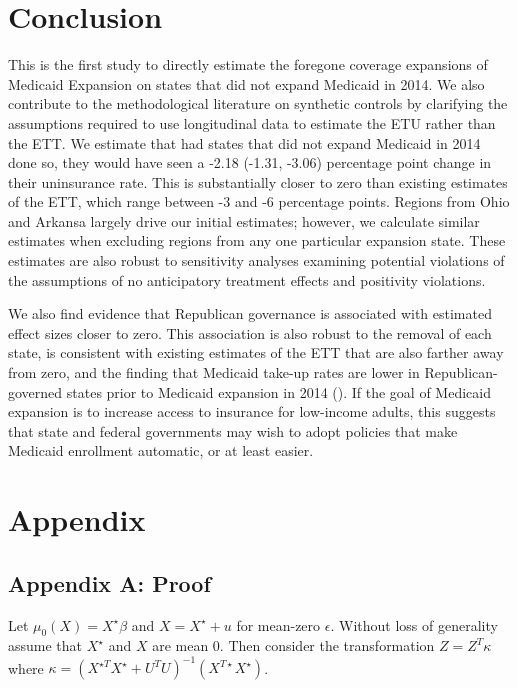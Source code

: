 \documentclass[12pt]{article}
\begin{document}
\section{Conclusion}

This is the first study to directly estimate the foregone coverage expansions of Medicaid Expansion on states that did not expand Medicaid in 2014. We also contribute to the methodological literature on synthetic controls by clarifying the assumptions required to use longitudinal data to estimate the ETU rather than the ETT. We estimate that had states that did not expand Medicaid in 2014 done so, they would have seen a -2.18 (-1.31, -3.06) percentage point change in their uninsurance rate. This is substantially closer to zero than existing estimates of the ETT, which range between -3 and -6 percentage points. Regions from Ohio and Arkansa largely drive our initial estimates; however, we calculate similar estimates when excluding regions from any one particular expansion state. These estimates are also robust to sensitivity analyses examining potential violations of the assumptions of no anticipatory treatment effects and positivity violations. 

We also find evidence that Republican governance is associated with estimated effect sizes closer to zero. This association is also robust to the removal of each state, is consistent with existing estimates of the ETT that are also farther away from zero, and the finding that Medicaid take-up rates are lower in Republican-governed states prior to Medicaid expansion in 2014 (\cite{sommers2012understanding}). If the goal of Medicaid expansion is to increase access to insurance for low-income adults, this suggests that state and federal governments may wish to adopt policies that make Medicaid enrollment automatic, or at least easier.

\cleardoublepage
 

\cleardoublepage

\section{Appendix}

\subsection{Appendix A: Proof}

Let $\mu_0(X) = X^\star\beta$ and $X = X^\star + u$ for mean-zero $\epsilon$. Without loss of generality assume that $X^\star$ and $X$ are mean 0. Then consider the transformation $Z = Z^T\kappa$ where $\kappa = (X^{\star T}X^\star + U^TU)^{-1}(X^{T \star}X^\star)$. 
\end{document}
